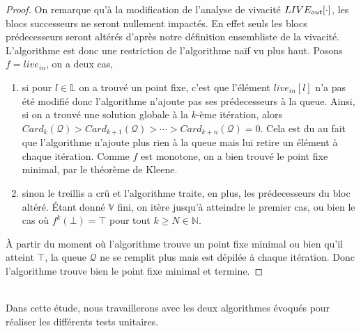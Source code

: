\documentclass[a4paper, 10pt]{article}
\begin{document}
\begin{proof}
On remarque qu'à la modification de l'analyse de vivacité $LIVE_{out}[\cdot]$,
les blocs successeurs ne seront nullement impactés. En effet seuls les blocs prédecesseurs seront
altérés d'après notre définition ensembliste de la vivacité. L'algorithme est donc une restriction de l'algorithme naïf vu plus
haut. Posons $f = live_{in}$, on a deux cas,
\begin{enumerate}
	\item si pour $l \in \mathbb{L}$ on a trouvé un point fixe, c'est que l'élément $live_{in}[l]$ n'a pas été modifié donc
	l'algorithme n'ajoute pas ses prédecesseurs à la queue. Ainsi, si on a trouvé une solution globale à la $k$-ème itération, 
	alors $Card_k(\mathcal{Q}) > Card_{k+1}(\mathcal{Q}) > \cdots > Card_{k + n}(\mathcal{Q}) = 0$. Cela est du au fait que
	l'algorithme n'ajoute plus rien à la queue mais lui retire un élément à chaque itération. Comme $f$ est monotone, on
	a bien trouvé le point fixe minimal, par le théorème de Kleene.
	\item sinon le treillis a crû et l'algorithme traite, en plus, les prédecesseurs du bloc altéré. Étant donné $\mathbb{V}$ fini,
	on itère jusqu'à atteindre le premier cas, ou bien le cas où $f^k(\bot) = \top$ pour tout $k \ge N \in \mathbb{N}$.
\end{enumerate}
À partir du moment où l'algorithme trouve un point fixe minimal ou bien qu'il atteint $\top$, la queue $\mathcal{Q}$ ne se remplit
plus mais est dépilée à chaque itération. Donc l'algorithme trouve bien le point fixe minimal et termine.
\end{proof}
\\
Dans cette étude, nous travaillerons avec les deux algorithmes évoqués pour réaliser les différents tests unitaires.
\\
\\
\end{document}
